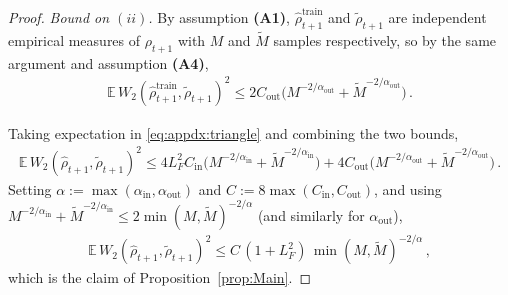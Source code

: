 \documentclass{article}
\theoremstyle{plain}
\theoremstyle{definition}
\theoremstyle{remark}
\begin{document}
\begin{proof}
  \emph{Bound on $(ii)$.} By assumption \textbf{(A1)}, $\hat\rho_{t+1}^{\mathrm{train}}$ and $\tilde\rho_{t+1}$ are independent empirical measures of $\rho_{t+1}$ with $M$ and $\tilde M$ samples respectively, so by the same argument and assumption \textbf{(A4)},
  \begin{align}
    \mathbb E\,W_2( \hat\rho_{t+1}^{\mathrm{train}}, \tilde\rho_{t+1} )^2 \leq 2 C_{\mathrm{out}} \big( M^{-2/\alpha_{\mathrm{out}}} + \tilde M^{-2/\alpha_{\mathrm{out}}} \big)\,.
  \end{align}

  Taking expectation in \eqref{eq:appdx:triangle} and combining the two bounds,
  \begin{align}
    \mathbb E\,W_2( \hat\rho_{t+1}, \tilde\rho_{t+1} )^2 \leq 4 L_F^2 C_{\mathrm{in}} \big( M^{-2/\alpha_{\mathrm{in}}} + \tilde M^{-2/\alpha_{\mathrm{in}}} \big) + 4 C_{\mathrm{out}} \big( M^{-2/\alpha_{\mathrm{out}}} + \tilde M^{-2/\alpha_{\mathrm{out}}} \big)\,.
  \end{align}
  Setting $\alpha := \max(\alpha_{\mathrm{in}},\alpha_{\mathrm{out}})$ and $C := 8\max(C_{\mathrm{in}},C_{\mathrm{out}})$, and using $M^{-2/\alpha_{\mathrm{in}}} + \tilde M^{-2/\alpha_{\mathrm{in}}} \leq 2\min(M,\tilde M)^{-2/\alpha}$ (and similarly for $\alpha_{\mathrm{out}}$),
  \begin{align}
    \mathbb E\,W_2( \hat\rho_{t+1}, \tilde\rho_{t+1} )^2 \leq C \,(1 + L_F^2)\, \min(M,\tilde M)^{-2/\alpha}\,,
  \end{align}
  which is the claim of Proposition~\ref{prop:Main}.


\end{proof}
\end{document}
